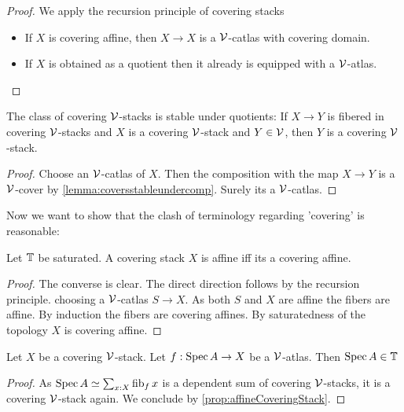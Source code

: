 \documentclass{article}
\begin{document}
\begin{proof}
We apply the recursion principle of covering stacks 
	\begin{itemize}
		\item If 	$X$ is covering affine, then $X \to X$ is a $\mathcal{V}$-catlas with covering domain. \\
\item If $X$ is obtained as a quotient then it already is equipped with a $\mathcal{V}$-atlas. %

	\end{itemize}
\end{proof}
\begin{prop}
	The class of covering $\mathcal{V}$-stacks is stable under quotients: If $X \to Y$ is fibered in covering $\mathcal{V}$-stacks and $X$ is a covering $\mathcal{V}$-stack and $Y \in \mathcal{V}$, then $Y$ is a covering $\mathcal{V}$-stack.
\end{prop}
\begin{proof}
	Choose an $\mathcal{V}$-catlas of $X$. Then the composition with the map $X \to Y$ is a $\mathcal{V}$-cover by \ref{lemma:coversstableundercomp}. Surely its a $\mathcal{V}$-catlas.
\end{proof}
Now we want to show that the clash of terminology regarding 'covering' is reasonable:


\begin{prop}{\label{prop:affineCoveringStack}}
	Let $\mathbb{T}$ be saturated.
	A covering stack $X$ is affine iff its a covering affine.
\end{prop}
\begin{proof}
	The converse is clear. The direct direction follows by the recursion principle. choosing a $\mathcal{V}$-catlas  $S \to X$. As both $S$ and $X$ are affine the fibers are affine. By induction the fibers are covering affines. By saturatedness of the topology $X$ is covering affine.
\end{proof}
\begin{lemma}{\label{lemma:atlasIsCatlas}}
	Let $X$ be a covering $\mathcal{V}$-stack. Let $f : \operatorname{Spec} A \to X$ be a $\mathcal{V}$-atlas. Then $\operatorname{Spec} A \in \mathbb{T}$
\end{lemma}
\begin{proof}
	As $\operatorname{Spec} A \simeq \sum_{x : X} \operatorname{fib}_f x$ is a dependent sum of covering $\mathcal{V}$-stacks, it is a covering $\mathcal{V}$-stack again. We conclude by \ref{prop:affineCoveringStack}.
\end{proof}	
\end{document}
